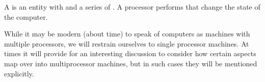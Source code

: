 \begin{definition}

A \footnotemark is an entity with  and a series of
.  A processor performs  that change the state of
the computer.


\end{definition}

While it may be modern (about time) to speak of computers as machines with
multiple processors, we will restrain ourselves to single processor machines.
At times it will provide for an interesting discussion to consider how certain
aspects map over into multiprocessor machines, but in such cases they will be
mentioned explicitly.

